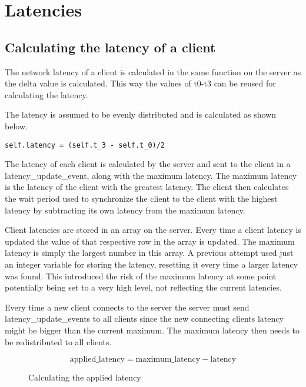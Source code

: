 \section{Latencies}

\subsection{Calculating the latency of a client}
The network latency of a client is calculated in the same function on the server as the delta value is calculated. This way the values of t0-t3 can be reused for calculating the latency. 

The latency is assumed to be evenly distributed and is calculated as shown below. 

\begin{verbatim}
self.latency = (self.t_3 - self.t_0)/2
\end{verbatim}

The latency of each client is calculated by the server and sent to the client in a latency\_update\_event, along with the maximum latency. The maximum latency is the latency of the client with the greatest latency. The client then calculates the wait period used to synchronize the client to the client with the highest latency by subtracting its own latency from the maximum latency.

Client latencies are stored in an array on the server. Every time a client latency is updated the value of that respective row in the array is updated. The maximum latency is simply the largest number in this array. A previous attempt used just an integer variable for storing the latency, resetting it every time a larger latency was found. This introduced the risk of the maximum latency at some point potentially being set to a very high level, not reflecting the current latencies. 


Every time a new client connects to the server the server must send latency\_update\_events to all clients since the new connecting clients latency might be bigger than the current maximum. The maximum latency then needs to be redistributed to all clients. 

\begin{figure}[h!]
	\begin{displaymath}
		\text{applied\_latency} = \text{maximum\_latency} - \text{latency}
	\end{displaymath}
	\caption{Calculating the applied latency}
	\label{fig:applatency}
\end{figure} 


